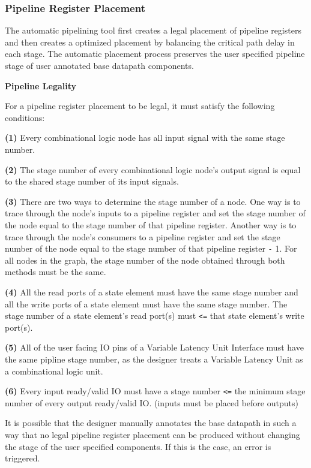 \subsubsection{Pipeline Register Placement}
\label{section:registerPlacement}
The automatic pipelining tool first creates a legal placement of pipeline registers and then creates a optimized placement by balancing the critical path delay in each stage. The automatic placement process preserves the user specified pipeline stage of user annotated base datapath components.


{\bf Pipeline Legality}

For a pipeline register placement to be legal, it must satisfy the following conditions:

{\bf (1)} Every combinational logic node has all input signal with the same stage number.  

{\bf (2)} The stage number of every combinational logic node's output signal is equal to the shared stage number of its input signals.

{\bf (3)} There are two ways to determine the stage number of a node. One way is to trace through the node's inputs to a pipeline register and set the stage number of the node equal to the stage number of that pipeline register. Another way is to trace through the node’s consumers to a pipeline register and set the stage number of the node equal to the stage number of that pipeline register {\tt -}  1. For all nodes in the graph, the stage number of the node obtained through both methods must be the same.

{\bf (4)} All the read ports of a state element must have the same stage number and all the write ports of a state element must have the same stage number. The stage number of a state element's read port(s) must {\tt <=} that state element's write port(s).

{\bf (5)} All of the user facing IO pins of a Variable Latency Unit Interface must have the same pipline stage number, as the designer treats a Variable Latency Unit as a combinational logic unit.

{\bf (6)} Every input ready/valid IO must have a stage number {\tt <=} the minimum stage number of every output ready/valid IO. (inputs must be placed before outputs)

It is possible that the designer manually annotates the base datapath in such a way that no legal pipeline register placement can be produced without changing the stage of the user specified components. If this is the case, an error is triggered.


